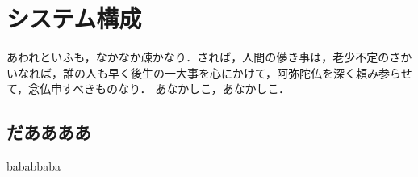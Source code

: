 
\chapter{システム構成}
あわれといふも，なかなか疎かなり．されば，人間の儚き事は，老少不定のさかいなれば，誰の人も早く後生の一大事を心にかけて，阿弥陀仏を深く頼み参らせて，念仏申すべきものなり． あなかしこ，あなかしこ．

\section{だああああ}
bababbaba

